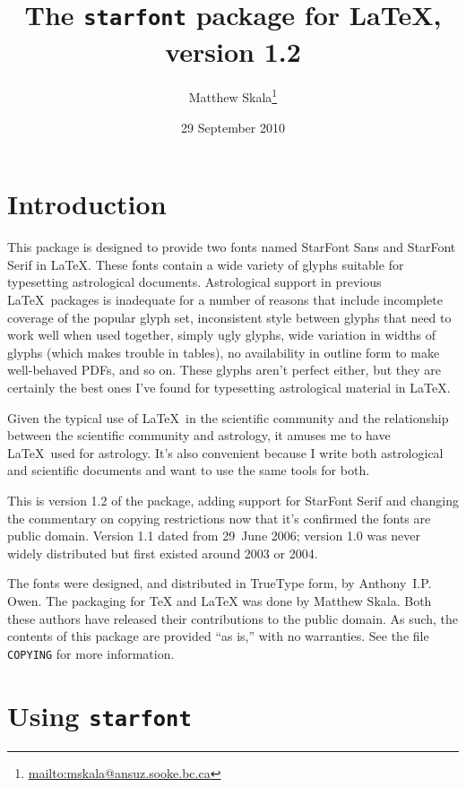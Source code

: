 \documentclass{article}
\begin{document}
\title{The \texttt{starfont} package for \LaTeX, version 1.2}
\author{Matthew Skala\thanks{\url{mailto:mskala@ansuz.sooke.bc.ca}}}
\date{29 September 2010}
\maketitle

\section{Introduction}

This package is designed to provide two fonts named StarFont Sans and
StarFont Serif in \LaTeX.  These fonts contain a wide variety of glyphs
suitable for typesetting astrological documents.  Astrological support in
previous \LaTeX\ packages is inadequate for a number of reasons that include
incomplete coverage of the popular glyph set, inconsistent style between
glyphs that need to work well when used together, simply ugly glyphs, wide
variation in widths of glyphs (which makes trouble in tables), no
availability in outline form to make well-behaved PDFs, and so on.  These
glyphs aren't perfect either, but they are certainly the best ones I've
found for typesetting astrological material in \LaTeX.

Given the typical use of \LaTeX\ in the scientific community and the
relationship between the scientific community and astrology, it amuses me to
have \LaTeX\ used for astrology.  It's also convenient because I write both
astrological and scientific documents and want to use the same tools for
both.

This is version 1.2 of the package, adding support for StarFont Serif and
changing the commentary on copying restrictions now that it's confirmed the
fonts are public domain.  Version 1.1 dated from 29~June 2006; version 1.0
was never widely distributed but first existed around 2003 or 2004.

The fonts were designed, and distributed in TrueType form, by
Anthony~I.P. Owen.  The packaging for TeX and LaTeX was done by Matthew
Skala.  Both these authors have released their contributions to the public
domain.  As such, the contents of this package are provided ``as is,'' with
no warranties.  See the file \texttt{COPYING} for more information.

\section{Using \texttt{starfont}}
\end{document}
